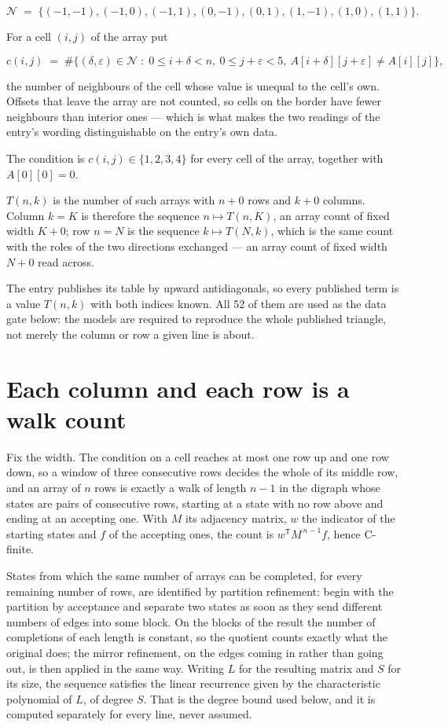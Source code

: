 \documentclass[11pt]{article}
\theoremstyle{definition}
\begin{document}
\[\mathcal{N} \;=\; \{(-1,-1), (-1,0), (-1,1), (0,-1), (0,1), (1,-1), (1,0), (1,1)\}.\]

For a cell $(i,j)$ of the array put

\[c(i,j) \;=\; \#\bigl\{(\delta,\varepsilon)\in\mathcal{N} \;:\; 0\le i+\delta<n,\ 0\le j+\varepsilon<5,\ A[i+\delta][j+\varepsilon] \neq A[i][j]\bigr\},\]

the number of neighbours of the cell whose value is unequal to the cell's own. Offsets that leave the array are not counted, so cells on the border have fewer neighbours than interior ones --- which is what makes the two readings of the entry's wording distinguishable on the entry's own data.

The condition is $c(i,j) \in \{1, 2, 3, 4\}$ for every cell of the array, together with $A[0][0]=0$.

$T(n,k)$ is the number of such arrays with $n + 0$ rows and $k + 0$ columns. Column $k = K$ is therefore the sequence $n \mapsto T(n,K)$, an array count of fixed width $K + 0$; row $n = N$ is the sequence $k \mapsto T(N,k)$, which is the same count with the roles of the two directions exchanged --- an array count of fixed width $N + 0$ read across.

The entry publishes its table by upward antidiagonals, so every published term is a value $T(n,k)$ with both indices known. All 52 of them are used as the data gate below: the models are required to reproduce the whole published triangle, not merely the column or row a given line is about.

\section{Each column and each row is a walk count}

Fix the width. The condition on a cell reaches at most one row up and one row down, so a window of three consecutive rows decides the whole of its middle row, and an array of $n$ rows is exactly a walk of length $n-1$ in the digraph whose states are pairs of consecutive rows, starting at a state with no row above and ending at an accepting one. With $M$ its adjacency matrix, $w$ the indicator of the starting states and $f$ of the accepting ones, the count is $w^{\mathsf T}M^{\,n-1}f$, hence C-finite.

States from which the same number of arrays can be completed, for every remaining number of rows, are identified by partition refinement: begin with the partition by acceptance and separate two states as soon as they send different numbers of edges into some block. On the blocks of the result the number of completions of each length is constant, so the quotient counts exactly what the original does; the mirror refinement, on the edges coming in rather than going out, is then applied in the same way. Writing $L$ for the resulting matrix and $S$ for its size, the sequence satisfies the linear recurrence given by the characteristic polynomial of $L$, of degree $S$. That is the degree bound used below, and it is computed separately for every line, never assumed.
\end{document}

